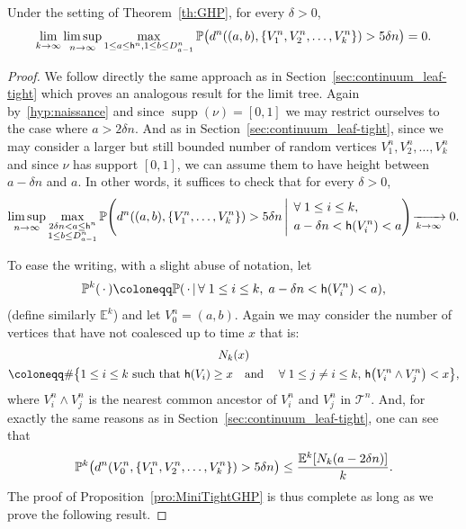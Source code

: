 \documentclass[10pt]{amsart}
\theoremstyle{definition}\newtheorem{defi}[theo]{Definition}\newtheorem{rema}[theo]{Remark}\newtheorem{exam}[theo]{Example}\newtheorem{exem}[theo]{Example}\newtheorem{nota}[theo]{Notation}
\newcommand{\proba}[1]{\mathbb{P}\left(#1\right)}
\newcommand{\probak}[1]{\mathbb{P}^k\left(#1\right)}
\DeclareMathOperator*{\supp}{supp}
\renewcommand{\P}{{\mathbb{P}}}
\newcommand{\E}{\mathbb{E}}
\newcommand{\1}{\mathbbm{1}}
\newcommand{\T}{\mathcal{T}}
\newcommand{\h}{\mathsf{h}}
\let\originalleft\left
\let\originalright\right
\renewcommand{\left}{\mathopen{}\mathclose\bgroup\originalleft}
\renewcommand{\right}{\aftergroup\egroup\originalright}
\renewcommand*{\to}{\mathchoice{\longrightarrow}{\rightarrow}{\rightarrow}{\rightarrow}}
\let\oldforall\forall
\renewcommand*{\forall}{\mathrel{\oldforall}}
\begin{document}
\begin{prop} \label{pro:MiniTightGHP}
Under the setting of Theorem~\ref{th:GHP}, for every $\delta>0$,
\[
\lim_{k\to \infty} \limsup_{n\to \infty} \max_{1\leq a\leq \h^n,1\leq b\leq D^n_{a-1}} \mathbb{P}\bigl(
d^n((a,b),\{V^n_1,V^n_2,\dots,V^n_k\})>{5}\delta n\bigr) = 0.
\]
\end{prop}
\begin{proof}
We follow directly the same approach as in Section~\ref{sec:continuum_leaf-tight} which proves an analogous result for the limit tree. Again by~\ref{hyp:naissance} and since $\supp(\nu)=[0,1]$ we may restrict {ourselves} to the case where $a>2\delta n$. And as in Section~\ref{sec:continuum_leaf-tight}, since we may consider a larger but still bounded number of random vertices $V_1^n, V_2^n,\dots, V_k^n$ and since $\nu$ has support $[0,1]$, we can assume them to have height between $a-\delta n$ and $a$. In other words, it suffices to check that for every $\delta>0$,
\begin{align*}
\limsup_{n\to \infty} \max_{\substack{2\delta n< a\leq \h^n\\1\leq b\leq D^n_{a-1}}} \proba{d^n((a,b),\{V^n_1,\dots,V^n_k\})> {5}\delta n\,\middle|\,
\begin{aligned} 
&\forall 1\leq i \leq k,\\
&\;a-\delta n<\h(V^n_i)<a
\end{aligned}
}\!
\xrightarrow[k\to \infty]{} 0.
\end{align*}

To ease the writing, with a slight abuse of notation, let
\[
\probak{\,\cdot\,}\coloneqq\proba{\,\cdot\, \middle |\, \forall 1\leq i \leq k,\; a-\delta n<\h(V^n_i)<a},
\]
(define similarly $\E^k$) and let $V_0^n=(a,b)$. Again we may consider the number of vertices that have not coalesced up to time $x$ that is:
\begin{multline*}
N_k(x)\\
\coloneqq\#\left\{1\leq i \leq k \text{ such that } \h(V_i)\geq x\quad\text{and}\quad \forall 1\leq j \neq i \leq k, \, \h\left(V^n_i\wedge V^n_j\right)<x\right\},
\end{multline*}
where $V^n_i \wedge V^n_j$ is the nearest common ancestor of $V^n_i$ and $V^n_j$ in $\T^n$. And, for exactly the same reasons as in Section~\ref{sec:continuum_leaf-tight}, one can see that
\[
\P^k\bigl(d^n\left(V^n_0, \left\{V^n_1, V^n_2, \dots, V^n_k\right\}\right) > {5}\delta n\bigr) \le \frac{\E^k\left[N_k(a-2\delta n)\right]}{k}.
\]
The proof of Proposition~\ref{pro:MiniTightGHP} is thus complete as long as we prove the following result.
\end{proof}
\end{document}
